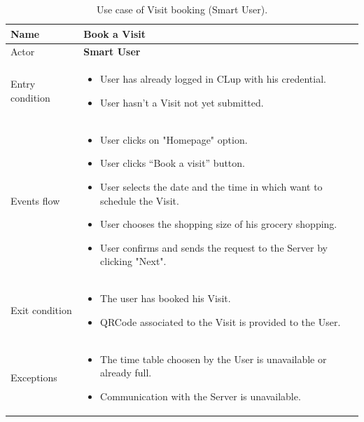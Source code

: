 \begin{table}[H]\begin{tabular}{|p{5cm} | p{7cm} | }
	\hline
	Name & \textbf{Book a Visit} \\
	\hline
	Actor & \textbf{Smart User} \\
	\hline
	Entry condition &
	\begin{itemize}
		\item User has already logged in CLup with his credential.  
		\item User hasn't a Visit not yet submitted. 
	\end{itemize} \\
	\hline
	Events flow & 
	\begin{itemize}
		\item User clicks on "Homepage" option.
		\item User clicks “Book a visit” button.
		\item User selects the date and the time in which want to schedule the Visit.
		\item User chooses the shopping size of his grocery shopping.
		\item User confirms and sends the request to the Server by clicking "Next". 
	\end{itemize} \\
	\hline
	Exit condition & 	
    \begin{itemize}
    \item The user has booked his Visit.
    \item QRCode associated to the Visit is provided to the User. 
    \end{itemize}
 \\
	\hline 
	Exceptions & \begin{itemize}
		\item The time table choosen by the User is unavailable or already full.
        \item Communication with the Server is unavailable.
	\end{itemize}  \\ 
	\hline
\end{tabular}
\caption{Use case of Visit booking (Smart User).}
\end{table}

\bigbreak

